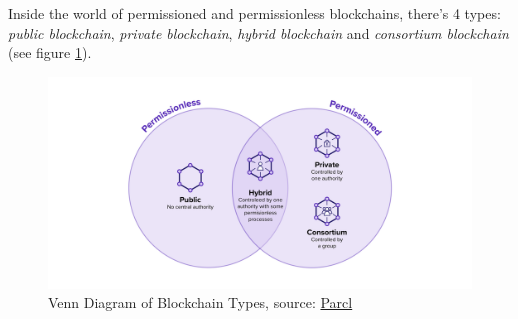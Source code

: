 Inside the world of permissioned and permissionless blockchains, there's 4 types: \textit{public blockchain}, \textit{private blockchain}, \textit{hybrid blockchain} and \textit{consortium blockchain} (see figure \ref{fig:type})\cite{bc_types}.

\begin{figure}[htbp]
	\centering
	\includegraphics[scale=0.2]{figures/perm.png}  %
	\caption{Venn Diagram of Blockchain Types, source: \href{https://www.parcl.co/blog/the-4-types-of-blockchain-and-why-you-should-know-the-difference}{Parcl}}
	\label{fig:type}
\end{figure}

